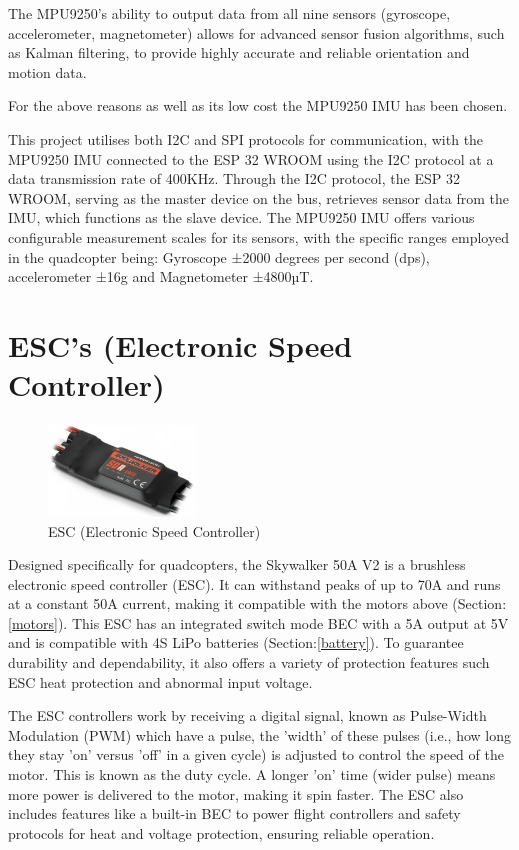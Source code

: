 \documentclass{report}
\begin{document}
The MPU9250's ability to output data from all nine sensors (gyroscope,
accelerometer, magnetometer) allows for advanced sensor fusion algorithms, such
as Kalman filtering, to provide highly accurate and reliable orientation and
motion data.

For the above reasons as well as its low cost the MPU9250 IMU has been chosen.

This project utilises both I2C and SPI protocols for communication, with the
MPU9250 IMU connected to the ESP 32 WROOM using the I2C protocol at a data
transmission rate of 400KHz. Through the I2C protocol, the ESP 32 WROOM, serving
as the master device on the bus, retrieves sensor data from the IMU, which
functions as the slave device. The MPU9250 IMU offers various configurable
measurement scales for its sensors, with the specific ranges employed in the
quadcopter being: Gyroscope ±2000 degrees per second (dps), accelerometer ±16g
and Magnetometer ±4800µT.

\section{ESC's (Electronic Speed Controller)}\label{esc}
\begin{figure}[H]
  \centering
  \includegraphics[width=0.35\textwidth]{Pictures/esc.png}
  \caption{ESC (Electronic Speed Controller)}
  \label{fig:esc}
\end{figure}
Designed specifically for quadcopters, the Skywalker 50A V2 is a brushless
electronic speed controller (ESC). It can withstand peaks of up to 70A and runs
at a constant 50A current, making it compatible with the motors above
(Section:\ref{motors}). This ESC has an integrated switch mode BEC with a 5A
output at 5V and is compatible with 4S LiPo batteries (Section:\ref{battery}).
To guarantee durability and dependability, it also offers a variety of
protection features such ESC heat protection and abnormal input voltage.

The ESC controllers work by receiving a digital signal, known as Pulse-Width
Modulation (PWM) which have a pulse, the 'width' of these pulses (i.e., how long
they stay 'on' versus 'off' in a given cycle) is adjusted to control the speed
of the motor. This is known as the duty cycle. A longer 'on' time (wider pulse)
means more power is delivered to the motor, making it spin faster. The ESC also
includes features like a built-in BEC to power flight controllers and safety
protocols for heat and voltage protection, ensuring reliable operation.
\end{document}
